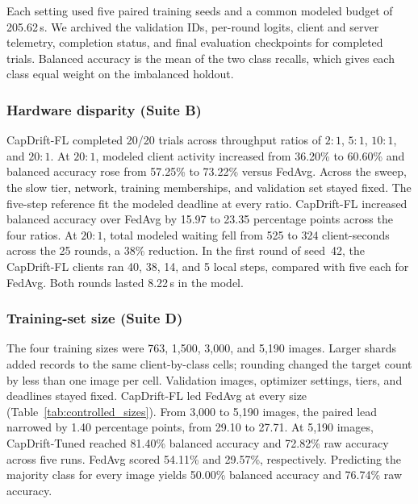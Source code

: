 \documentclass[conference]{IEEEtran}
\begin{document}
Each setting used five paired training seeds and a common modeled budget of 205.62\,s. We archived the validation IDs, per-round logits, client and server telemetry, completion status, and final evaluation checkpoints for completed trials. Balanced accuracy is the mean of the two class recalls, which gives each class equal weight on the imbalanced holdout.

\subsubsection{Hardware disparity (Suite B)}

CapDrift-FL completed 20/20 trials across throughput ratios of $2{:}1$, $5{:}1$, $10{:}1$, and $20{:}1$. At $20{:}1$, modeled client activity increased from 36.20\% to 60.60\% and balanced accuracy rose from 57.25\% to 73.22\% versus FedAvg. Across the sweep, the slow tier, network, training memberships, and validation set stayed fixed. The five-step reference fit the modeled deadline at every ratio. CapDrift-FL increased balanced accuracy over FedAvg by 15.97 to 23.35 percentage points across the four ratios. At $20{:}1$, total modeled waiting fell from 525 to 324 client-seconds across the 25 rounds, a 38\% reduction. In the first round of seed~42, the CapDrift-FL clients ran 40, 38, 14, and 5 local steps, compared with five each for FedAvg. Both rounds lasted 8.22\,s in the model.

\subsubsection{Training-set size (Suite D)}

The four training sizes were 763, 1,500, 3,000, and 5,190 images. Larger shards added records to the same client-by-class cells; rounding changed the target count by less than one image per cell. Validation images, optimizer settings, tiers, and deadlines stayed fixed. CapDrift-FL led FedAvg at every size (Table~\ref{tab:controlled_sizes}). From 3,000 to 5,190 images, the paired lead narrowed by 1.40 percentage points, from 29.10 to 27.71. At 5,190 images, CapDrift-Tuned reached 81.40\% balanced accuracy and 72.82\% raw accuracy across five runs. FedAvg scored 54.11\% and 29.57\%, respectively. Predicting the majority class for every image yields 50.00\% balanced accuracy and 76.74\% raw accuracy.
\end{document}
